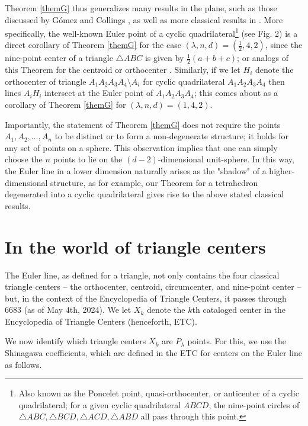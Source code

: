 \documentclass{birkjour}
\theoremstyle{definition}
\theoremstyle{remark}
\numberwithin{equation}{section}
\begin{document}
Theorem \ref{themG} thus generalizes many results in the plane, such as those discussed by Gómez \cite{Gomez} and Collings \cite{Collings}, as well as more classical results in \cite{Yaglom,Andrica}. More specifically, the well-known Euler point of a cyclic quadrilateral\footnote{Also known as the Poncelet point, quasi-orthocenter, or anticenter of a cyclic quadrilateral; for a given cyclic quadrilateral $ABCD$, the nine-point circles of $\triangle ABC, \triangle BCD, \triangle ACD, \triangle ABD$ all pass through this point.} (see Fig. 2) is a direct corollary of Theorem \ref{themG} for the case $(\lambda, n, d) = (\frac{1}{2}, 4, 2)$, since the nine-point center of a triangle $\triangle ABC$ is given by $\frac{1}{2}(a+b+c)$; or analogs of this Theorem for the centroid or orthocenter \cite{Bradley,Mammana}. Similarly, if we let $H_i$ denote the orthocenter of triangle $A_1A_2A_3A_4 \setminus A_i$ for cyclic quadrilateral $A_1A_2A_3A_4$ then lines $A_iH_i$ intersect at the Euler point of $A_1A_2A_3A_4$; this comes about as a corollary of Theorem \ref{themG} for $(\lambda, n, d) = (1, 4, 2)$. 

Importantly, the statement of Theorem \ref{themG} does not require the points $A_1, A_2, \ldots, A_n$ to be distinct or to form a non-degenerate structure; it holds for any set of points on a sphere. This observation implies that one can simply choose the $n$ points to lie on the $(d-2)$-dimensional unit-sphere. In this way, the Euler line in a lower dimension naturally arises as the "shadow" of a higher-dimensional structure, as for example, our Theorem for a tetrahedron degenerated into a cyclic quadrilateral gives rise to the above stated classical results.

\section{In the world of triangle centers}

The Euler line, as defined for a triangle, not only contains the four classical triangle centers -- the orthocenter, centroid, circumcenter, and nine-point center -- but, in the context of the Encyclopedia of Triangle Centers, it passes through $6683$ \cite{Kimberling} (as of May $4$th, 2024). We let $X_k$ denote the $k$th cataloged center in the Encyclopedia of Triangle Centers (henceforth, ETC).

We now identify which triangle centers \( X_k \) are \( P_{\lambda} \) points. For this, we use the Shinagawa coefficients, which are defined in the ETC \cite{Kimberling} for centers on the Euler line as follows.
\end{document}
